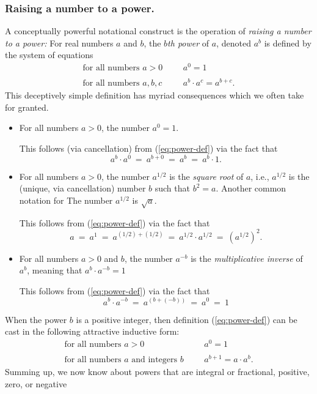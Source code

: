 \subsubsection{Raising a number to a power.}
\label{sec:x-toa-power}
A conceptually powerful notational construct is the operation of {\it
  raising a number to a power:}
%
For real numbers $a$ and $b$, the {\it $b$th power} of $a$, denoted
$a^b$ is defined by the system of equations
\begin{equation}
\label{eq:power-def}
\begin{array}{llll}
\mbox{for all numbers $a>0$} & & & a^0 = 1 \\
 & & & \\
\mbox{for all numbers $a, b, c$} & & & a^b \cdot a^c = a^{b+c}.
\end{array}
\end{equation}
This deceptively simple definition has myriad consequences which we
often take for granted.
\begin{itemize}
\item
For all numbers $a>0$, the number $a^0 = 1$.

This follows (via cancellation) from (\ref{eq:power-def}) via the fact
that
\[ a^b \cdot a^0 \ = \ a^{b+0} \ = \ a^b \ = \ a^b \cdot 1.  \]

\item
For all numbers $a >0$, the number $a^{1/2}$
is the {\it square root} of $a$,
i.e., $a^{1/2}$ is the (unique, via cancellation) number $b$ such that
$b^2 = a$.  Another common notation for The number $a^{1/2}$ is
$\sqrt{a}$.

This follows from (\ref{eq:power-def}) via the fact that
\[ a \ = \ a^1 \ = \ a^{(1/2) + (1/2)} \ = \ a^{1/2} \cdot a^{1/2} \ = \
\left(a^{1/2}\right)^2. \]

\item
For all numbers $a>0$ and $b$, the number $a^{-b}$ is the {\it
  multiplicative inverse}
of $a^b$, meaning that $a^b \cdot a^{-b} = 1$

This follows from (\ref{eq:power-def}) via the fact that
\[ a^b \cdot a^{-b} \ = \ a^{(b + (-b))} \ = \ a^0 \ = \  1 \]
\end{itemize}
When the power $b$ is a positive integer, then definition
(\ref{eq:power-def}) can be cast in the following attractive inductive
form:
\begin{equation}
\label{eq:power-def-integer}
\begin{array}{llll}
\mbox{for all numbers $a>0$} & & & a^0 = 1 \\
 & & & \\
\mbox{for all numbers $a$ and integers $b$} & & & a^{b+1} = a \cdot
a^b.
\end{array}
\end{equation}
Summing up, we now know about powers that are integral or fractional,
positive, zero, or negative

